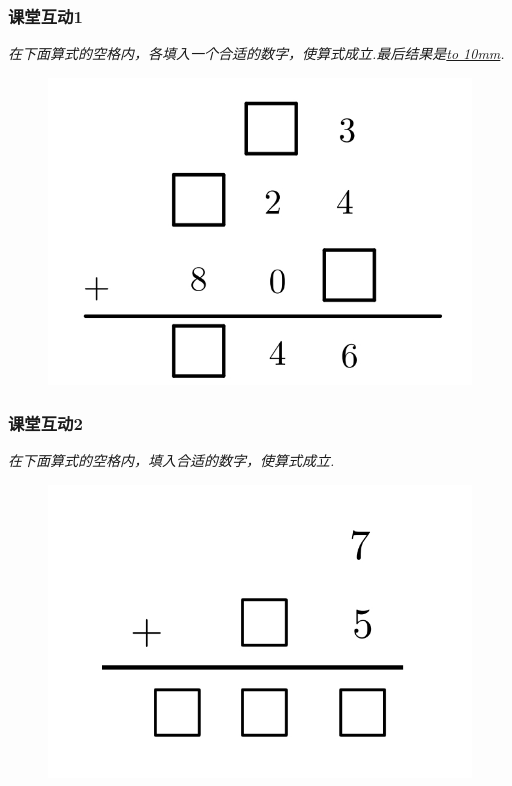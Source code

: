 \begin{frame}
    \frametitle{课堂互动1}
    \textit{在下面算式的空格内，各填入一个合适的数字，使算式成立.最后结果是\underline{\hbox to 10mm{}}.}
    \begin{figure}[H] 
        \centering
        \includegraphics[width=1\textwidth]{./pics/Chapter_3/ketanghudong1.png}
    \end{figure}
\end{frame}

\begin{frame}
    \frametitle{课堂互动2}
    \textit{在下面算式的空格内，填入合适的数字，使算式成立.}
    \begin{figure}[H] 
        \centering
        \includegraphics[width=1\textwidth]{./pics/Chapter_3/ketanghudong2.png}
    \end{figure}
\end{frame}

